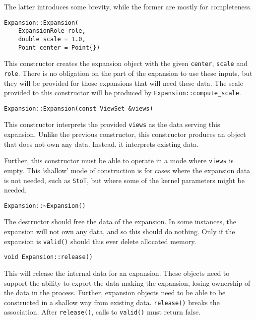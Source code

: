 \noindent The latter introduces some brevity, while the former are mostly
for completeness.

\begin{lstlisting}
Expansion::Expansion(
    ExpansionRole role,
    double scale = 1.0,
    Point center = Point{})
\end{lstlisting}

\noindent This constructor creates the expansion object with the given
\texttt{center}, \texttt{scale} and \texttt{role}. There is no obligation on
the part of the expansion to use these inputs, but they will be provided for
those expansions that will need these data.
The scale provided to this constructor will be produced by
\texttt{Expansion::compute\_scale}.

\begin{lstlisting}
Expansion::Expansion(const ViewSet &views)
\end{lstlisting}

\noindent This constructor interprets the provided \texttt{views} as the data
serving this expansion. Unlike the previous constructor, this constructor
produces an object that does not own any data. Instead, it interprets existing
data.

Further, this constructor must be able to operate in a mode where \texttt{views}
is empty. This `shallow' mode of construction is for cases where the
expansion data is not needed, such as \texttt{StoT}, but where
some of the kernel parameters might be needed.

\begin{lstlisting}
Expansion::~Expansion()
\end{lstlisting}

\noindent The destructor should free the data of the expansion. In some
instances, the expansion will not own any data, and so this should do nothing.
Only if the expansion is \texttt{valid()} should this ever delete allocated
memory.

\begin{lstlisting}
void Expansion::release()
\end{lstlisting}

\noindent This will release the internal data for an expansion. These objects
need to support the ability to export the data making the expansion, losing
ownership of the data in the process. Further, expansion objects need to be
able to be constructed in a shallow way from existing data. \texttt{release()}
breaks the association. After \texttt{release()}, calls to \texttt{valid()}
must return false.


